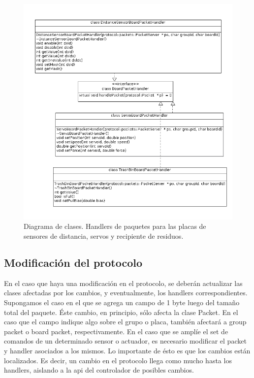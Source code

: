\begin{figure}[ht]
	\centering
	\includegraphics[scale=0.52]{comportamientos/figures/cs6.png}
	\caption[Diagrama de clases: Handlers 2]{Diagrama de clases. Handlers de paquetes para las placas de sensores de 
	distancia, servos y recipiente de residuos.}
	\label{fig:handler_specific_2}
\end{figure}


\subsection{Modificaci\'on del protocolo}
En el caso que haya una modificaci\'on en el protocolo, se deber\'an
actualizar las clases afectadas por los cambios, y eventualmente,
los handlers correspondientes.
\\\indent
Supongamos el caso en el que se agrega un campo de 1 byte luego del tama\~no
total del paquete. \'Este cambio, en principio, s\'olo afecta la clase
Packet. En el caso que el campo indique algo sobre el grupo o placa,
tambi\'en afectar\'a a group packet o board packet, respectivamente.
En el caso que se ampl\'ie el set de comandos de un determinado sensor o
actuador, es necesario modificar el packet y handler asociados a los
mismos. Lo importante de \'esto es que los cambios est\'an localizados.
Es decir, un cambio en el protocolo llega como mucho hasta los handlers,
aislando a la api del controlador de posibles cambios.





